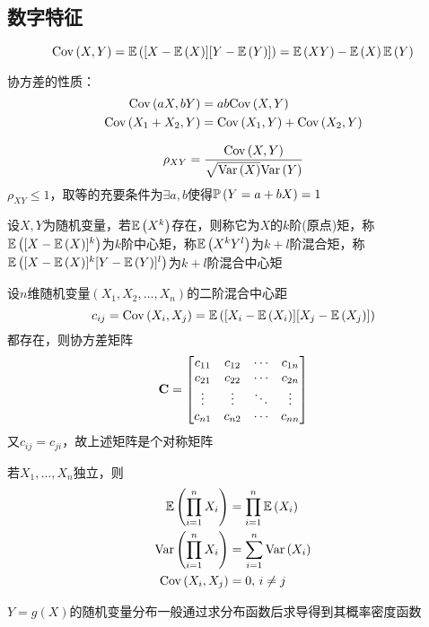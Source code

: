 \subsection{数字特征}
\begin{definition}[协方差]
\[\Cov{X,Y}=\E{[X-\E{X}][Y-\E{Y}]}=\E{XY}-\E{X}\E{Y}\]
\end{definition}
协方差的性质：
\[\begin{aligned}
\Cov{aX,bY}&=ab\Cov{X,Y}\\
\Cov{X_1+X_2,Y}&=\Cov{X_1,Y}+\Cov{X_2,Y}
\end{aligned}\]
\begin{definition}[相关系数]
\[\rho_{XY}=\frac{\Cov{X,Y}}{\sqrt{\Var{X}}{\Var{Y}}}\]
$\rho_{XY}\leq 1$，取等的充要条件为$\exists a,b$使得$\pr{Y=a+bX}=1$
\end{definition}
\begin{definition}[矩]
设$X,Y$为随机变量，若$\E{X^k}$存在，则称它为$X$的$k$阶(原点)矩，称$\E{[X-\E{X}]^k}$为$k$阶中心矩，称$\E{X^kY^l}$为$k+l$阶混合矩，称$\E{[X-\E{X}]^k[Y-\E{Y}]^l}$为$k+l$阶混合中心矩
\end{definition}
\begin{definition}[协方差矩阵]
设$n$维随机变量$(X_1,X_2,\ldots,X_n)$的二阶混合中心距
\[c_{ij}=\Cov{X_i,X_j}=\E{[X_i-\E{X_i}][X_j-\E{X_j}]}\]
都存在，则协方差矩阵
\[\mC=\begin{bmatrix}
c_{11}&c_{12}&\cdots&c_{1n}\\
c_{21}&c_{22}&\cdots&c_{2n}\\
\vdots&\vdots&\ddots&\vdots\\
c_{n1}&c_{n2}&\cdots&c_{nn}
\end{bmatrix}\]
又$c_{ij}=c_{ji}$，故上述矩阵是个对称矩阵
\end{definition}
\begin{theorem}
若$X_1,\ldots,X_n$独立，则
\[\begin{aligned}
\E{\prod_{i=1}^nX_i}&=\prod_{i=1}^n\E{X_i}\\
\Var{\prod_{i=1}^nX_i}&=\sum_{i=1}^n\Var{X_i}\\
\Cov{X_i,X_j}&=0,\,i\ne j
\end{aligned}\]
\end{theorem}
$Y=g(X)$的随机变量分布一般通过求分布函数后求导得到其概率密度函数